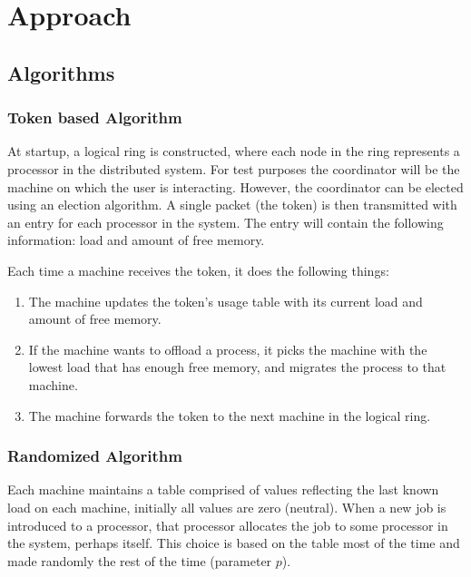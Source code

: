 \documentclass{article}
\begin{document}


\section{Approach}

\subsection{Algorithms}

\subsubsection{Token based Algorithm}

At startup, a logical ring is constructed, where each node in the ring
represents a processor in the distributed system.  For test purposes the
coordinator will be the machine on which the user is interacting.  However,
the coordinator can be elected using an election algorithm.  A single packet
(the token) is then transmitted with an entry for each processor in the
system.  The entry will contain the following information: load and amount
of free memory.

Each time a machine receives the token, it does the following things:

\begin{enumerate}
  \item The machine updates the token's usage table with its current load
  and amount of free memory.

  \item If the machine wants to offload a process, it picks the machine with
  the lowest load that has enough free memory, and migrates the
  process to that machine.  

  \item The machine forwards the token to the next machine in the logical
  ring. 
\end{enumerate}

\subsubsection{Randomized Algorithm}

Each machine maintains a table comprised of values reflecting the last known
load on each machine, initially all values are zero (neutral).  When a new
job is introduced to a processor, that processor allocates the job to some
processor in the system, perhaps itself.  This choice is based on the table
most of the time and made randomly the rest of the time (parameter $p$).
\end{document}
